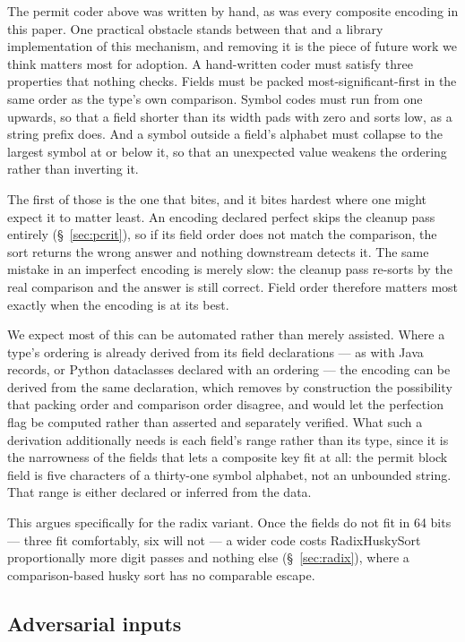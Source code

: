 \documentclass[twoside,leqno,twocolumn]{article}
\begin{document}
The permit coder above was written by hand, as was every composite encoding in this paper.
One practical obstacle stands between that and a library implementation of this mechanism,
and removing it is the piece of future work we think matters most for adoption.
A hand-written coder must satisfy three properties that nothing checks.
Fields must be packed most-significant-first in the same order as the type's own comparison.
Symbol codes must run from one upwards, so that a field shorter than its width pads with zero and
sorts low, as a string prefix does.
And a symbol outside a field's alphabet must collapse to the largest symbol at or below it,
so that an unexpected value weakens the ordering rather than inverting it.

The first of those is the one that bites, and it bites hardest where one might expect it to matter
least.
An encoding declared perfect skips the cleanup pass entirely (\S~\ref{sec:pcrit}),
so if its field order does not match the comparison, the sort returns the wrong answer and nothing
downstream detects it.
The same mistake in an imperfect encoding is merely slow: the cleanup pass re-sorts by the real
comparison and the answer is still correct.
Field order therefore matters most exactly when the encoding is at its best.

We expect most of this can be automated rather than merely assisted.
Where a type's ordering is already derived from its field declarations ---
as with Java records, or Python dataclasses declared with an ordering ---
the encoding can be derived from the same declaration,
which removes by construction the possibility that packing order and comparison order disagree,
and would let the perfection flag be computed rather than asserted and separately verified.
What such a derivation additionally needs is each field's range rather than its type,
since it is the narrowness of the fields that lets a composite key fit at all:
the permit block field is five characters of a thirty-one symbol alphabet, not an unbounded string.
That range is either declared or inferred from the data.

This argues specifically for the radix variant.
Once the fields do not fit in 64 bits --- three fit comfortably, six will not ---
a wider code costs RadixHuskySort proportionally more digit passes and nothing else (\S~\ref{sec:radix}),
where a comparison-based husky sort has no comparable escape.

\subsection{Adversarial inputs}
\label{sec:adversarial}
\end{document}

